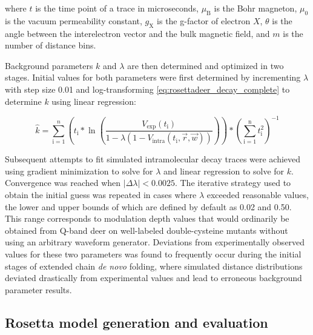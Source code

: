 where $t$ is the time point of a trace in microseconds, $\mu_{\mathup{B}}$ is the Bohr magneton, $\mu_{\mathup{0}}$ is the vacuum permeability constant, $g_{\mathup{X}}$ is the g-factor of electron $X$, $\theta$ is the angle between the interelectron vector and the bulk magnetic field, and $m$ is the number of distance bins.

Background parameters $k$ and $\lambda$ are then determined and optimized in two stages. Initial values for both parameters were first determined by incrementing $\lambda$ with step size 0.01 and log-transforming \ref{eq:rosettadeer_decay_complete} to determine $k$ using linear regression:

\begin{equation}\label{eq:rosettadeer_logtransform}
\hat{k} = \sum^{n}_{\mathup{i}=1} \left(t_{\mathup{i}}*\ln\left(\frac{V_{\mathup{exp}}\left(t_{\mathup{i}}\right)}{1-\lambda \left(1-V_{\mathup{intra}}\left(t_{\mathup{i}},\vec{r}, \vec{w}\right)\right)}\right)\right) * \left(\sum^{\mathup{n}}_{\mathup{i}=1} t^{2}_{\mathup{i}}\right)^{-1}
\end{equation}

Subsequent attempts to fit simulated intramolecular decay traces were achieved using gradient minimization to solve for $\lambda$ and linear regression to solve for $k$. Convergence was reached when $\lvert \Delta \lambda \rvert < 0.0025$. The iterative strategy used to obtain the initial guess was repeated in cases where $\lambda$ exceeded reasonable values, the lower and upper bounds of which are defined by default as 0.02 and 0.50. This range corresponds to modulation depth values that would ordinarily be obtained from Q-band \gls{deer} on well-labeled double-cysteine mutants without using an arbitrary waveform generator. Deviations from experimentally observed values for these two parameters was found to frequently occur during the initial stages of extended chain \emph{de novo} folding, where simulated distance distributions deviated drastically from experimental values and lead to erroneous background parameter results. 

\subsection{Rosetta model generation and evaluation}\label{sec:rosettadeer_enrichment}

